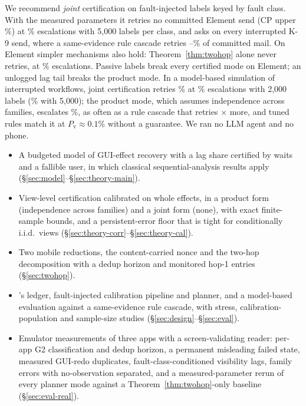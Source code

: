 We recommend \emph{joint} certification on fault-injected labels keyed by fault class. With the measured parameters it retries no committed Element send (CP upper
\RsimFiveJointPvHi\%) at \RsimFiveJointAsk\% escalations with 5{,}000 labels per class, and asks on every interrupted K-9 send, where a same-evidence rule cascade retries
\RsimKsentRulesPv--\RsimKnineRulesPv\% of committed mail. On Element simpler mechanisms also hold: Theorem~\ref{thm:twohop} alone never retries, at \RsimElemGtwoAsk\% escalations.
Passive labels break every certified mode on Element; an unlogged lag tail breaks the product mode. In a model-based simulation of \SimN interrupted workflows, joint certification retries \SimJointPv\% at
\SimJointAsk\% escalations with 2{,}000 labels (\NcalFJointAsk\% with 5{,}000); the product mode, which assumes independence across families, escalates \SimGhostAsk\%, as
often as a rule cascade that retries \SimRulesRatio$\times$ more, and tuned rules match it at $P_{\mathrm{v}}\approx0.1\%$ without a guarantee. We ran no LLM agent and no phone.

\begin{itemize}[leftmargin=*,topsep=2pt,itemsep=1pt]
\item A budgeted model of GUI-effect recovery with a lag share certified by waits and a fallible user, in which classical sequential-analysis results apply (\S\ref{sec:model}--\S\ref{sec:theory-main}).
\item View-level certification calibrated on whole effects, in a product form (independence across families) and a joint form (none), with exact finite-sample bounds, and a persistent-error
  floor that is tight for conditionally i.i.d.\ views (\S\ref{sec:theory-corr}--\S\ref{sec:theory-cal}).
\item Two mobile reductions, the content-carried nonce and the two-hop decomposition with a dedup horizon and monitored hop-1 entries (\S\ref{sec:twohop}).
\item \sys's ledger, fault-injected calibration pipeline and planner, and a model-based evaluation against a same-evidence rule cascade, with stress, calibration-population and
  sample-size studies (\S\ref{sec:design}--\S\ref{sec:eval}).
\item Emulator measurements of three apps with a screen-validating reader: per-app G2 classification and dedup horizon, a permanent misleading failed state, measured GUI-redo
  duplicates, fault-class-conditioned visibility lags, family errors with no-observation separated, and a measured-parameter rerun of every planner mode against a
  Theorem~\ref{thm:twohop}-only baseline (\S\ref{sec:eval-real}).
\end{itemize}
